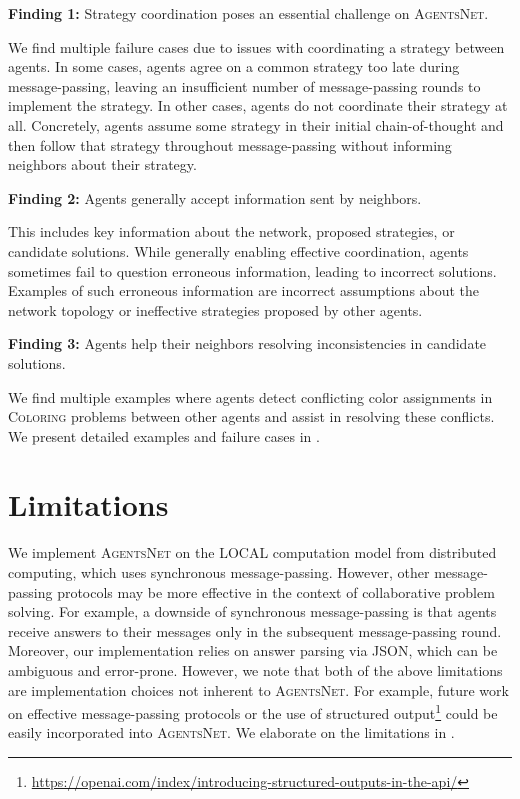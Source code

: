 \documentclass{article}
\newlength{\chatlogwidth}
\newenvironment{chatlog}{
  \noindent
  \begin{minipage}{\chatlogwidth}
  \begin{mdframed}[
    backgroundcolor=chatbg,
    leftline=true,
    rightline=false,
    topline=false,
    bottomline=false,
    linecolor=chatsideline,
    linewidth=3pt,
    innerleftmargin=15pt,
    innerrightmargin=20pt,
    innertopmargin=10pt,
    innerbottommargin=5pt
  ]
}{
  \vspace{-0.2em}
  \end{mdframed}
  \end{minipage}
}
\newcommand{\benchmark}{\textsc{AgentsNet}}
\begin{document}
\begin{chatlog}
    \textbf{Finding 1:} Strategy coordination poses an essential challenge on \benchmark{}.
    \vspace{7px}
\end{chatlog}

We find multiple failure cases due to issues with coordinating a strategy between agents. In some cases, agents agree on a common strategy too late during message-passing, leaving an insufficient number of message-passing rounds to implement the strategy. 
In other cases, agents do not coordinate their strategy at all. Concretely, agents assume some strategy in their initial chain-of-thought and then follow that strategy throughout message-passing without informing neighbors about their strategy.%

\begin{chatlog}
    \textbf{Finding 2:} Agents generally accept information sent by neighbors.
    \vspace{7px}
\end{chatlog}

This includes key information about the network, proposed strategies, or candidate solutions. While generally enabling effective coordination, agents sometimes fail to question erroneous information, leading to incorrect solutions. Examples of such erroneous information are incorrect assumptions about the network topology or ineffective strategies proposed by other agents.

\begin{chatlog}
    \textbf{Finding 3:} Agents help their neighbors resolving inconsistencies in candidate solutions.
    \vspace{7px}
\end{chatlog}

We find multiple examples where agents detect conflicting color assignments in \textsc{Coloring} problems between other agents and assist in resolving these conflicts.
We present detailed examples and failure cases in .

\section{Limitations}\label{sec:limitations}
We implement \benchmark{} on the LOCAL computation model from distributed computing, which uses synchronous message-passing. However, other message-passing protocols may be more effective in the context of collaborative problem solving. For example, a downside of synchronous message-passing is that agents receive answers to their messages only in the subsequent message-passing round. Moreover, our implementation relies on answer parsing via JSON, which can be ambiguous and error-prone. However, we note that both of the above limitations are implementation choices not inherent to \benchmark{}. For example, future work on effective message-passing protocols or the use of structured output\footnote{\url{https://openai.com/index/introducing-structured-outputs-in-the-api/}} could be easily incorporated into \benchmark{}. 
We elaborate on the limitations in .
\end{document}
